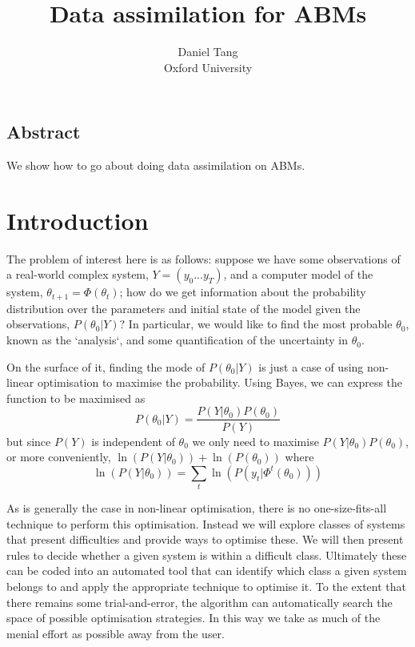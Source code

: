 \documentclass[letterpaper,twocolumn,10pt]{article}
\begin{document}
\date{}

\title{\Large \bf Data assimilation for ABMs}

\author{
{\rm Daniel Tang}\\
Oxford University
}

\maketitle



\subsection*{Abstract}

We show how to go about doing data assimilation on ABMs.

\section{Introduction}

The problem of interest here is as follows: suppose we have some observations of a real-world complex system, $Y=(y_0...y_T)$, and a computer model of the system, $\theta_{t+1} = \Phi(\theta_t)$; how do we get information about the probability distribution over the parameters and initial state of the model given the observations, $P(\theta_0|Y)$? In particular, we would like to find the most probable $\theta_0$, known as the `analysis`, and some quantification of the uncertainty in $\theta_0$.

On the surface of it, finding the mode of $P(\theta_0|Y)$ is just a case of using non-linear optimisation to maximise the probability. Using Bayes, we can express the function to be maximised as
\[
P(\theta_0|Y) = \frac{P(Y|\theta_0)P(\theta_0)}{P(Y)}
\]
but since $P(Y)$ is independent of $\theta_0$ we only need to maximise  $P(Y|\theta_0)P(\theta_0)$, or more conveniently, $\ln(P(Y|\theta_0))+\ln(P(\theta_0))$ where
\[
\ln{(P(Y|\theta_0))} = \sum_t{\ln{(P(y_t|\Phi^t(\theta_0)))}}
\]

As is generally the case in non-linear optimisation, there is no one-size-fits-all technique to perform this optimisation. Instead we will explore classes of systems that present difficulties and provide ways to optimise these. We will then present rules to decide whether a given system is within a difficult class. Ultimately these can be coded into an automated tool that can identify which class a given system belongs to and apply the appropriate technique to optimise it. To the extent that there remains some trial-and-error, the algorithm can automatically search the space of possible optimisation strategies. In this way we take as much of the menial effort as possible away from the user.
\end{document}
